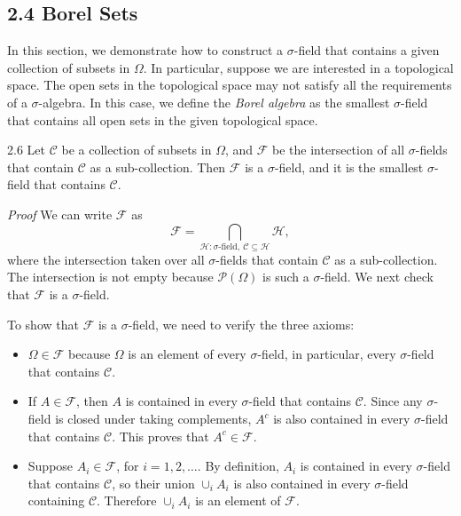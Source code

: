 \subsection*{2.4 Borel Sets}

In this section, we demonstrate how to construct a $\sigma$-field that contains a given collection of subsets in $\Omega$. In particular, suppose we are interested in a topological space. The open sets in the topological space may not satisfy all the requirements of a $\sigma$-algebra. In this case, we define the \textit{Borel algebra} as the smallest $\sigma$-field that contains all open sets in the given topological space.

\begin{thmbox}{2.6}
Let $\mathcal{C}$ be a collection of subsets in $\Omega$, and $\mathcal{F}$ be the intersection of all $\sigma$-fields that contain $\mathcal{C}$ as a sub-collection. Then $\mathcal{F}$ is a $\sigma$-field, and it is the smallest $\sigma$-field that contains $\mathcal{C}$.
\end{thmbox}

\textit{Proof} We can write $\mathcal{F}$ as
\[
\mathcal{F}
=
\bigcap_{\mathcal{H}:\sigma\text{-field},\ \mathcal{C}\subseteq \mathcal{H}} \mathcal{H},
\]
where the intersection taken over all $\sigma$-fields that contain $\mathcal{C}$ as a sub-collection. The intersection is not empty because $\mathcal{P}(\Omega)$ is such a $\sigma$-field. We next check that $\mathcal{F}$ is a $\sigma$-field.

To show that $\mathcal{F}$ is a $\sigma$-field, we need to verify the three axioms:
\begin{itemize}
    \item $\Omega\in \mathcal{F}$ because $\Omega$ is an element of every $\sigma$-field, in particular, every $\sigma$-field that contains $\mathcal{C}$.
    \item If $A\in \mathcal{F}$, then $A$ is contained in every $\sigma$-field that contains $\mathcal{C}$. Since any $\sigma$-field is closed under taking complements, $A^c$ is also contained in every $\sigma$-field that contains $\mathcal{C}$. This proves that $A^c\in \mathcal{F}$.
    \item Suppose $A_i\in \mathcal{F}$, for $i=1,2,\dots$. By definition, $A_i$ is contained in every $\sigma$-field that contains $\mathcal{C}$, so their union $\cup_i A_i$ is also contained in every $\sigma$-field containing $\mathcal{C}$. Therefore $\cup_i A_i$ is an element of $\mathcal{F}$.
\end{itemize}

